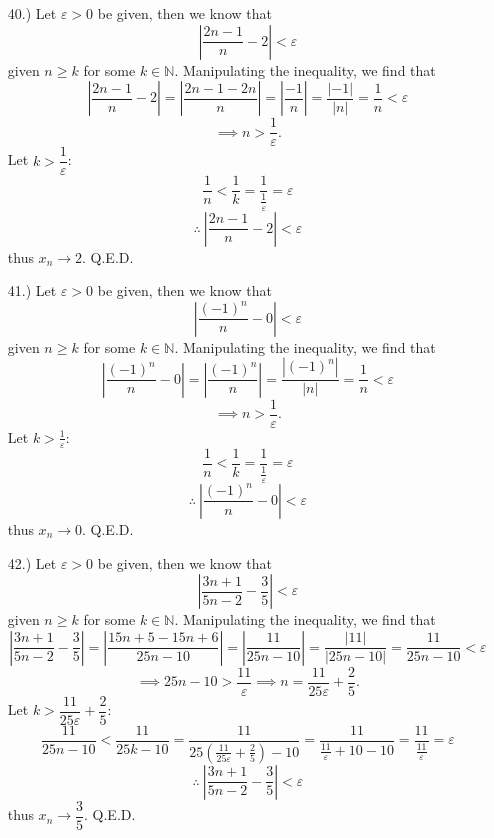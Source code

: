 \documentclass[12pt]{article}
\newcommand{\vertb}[1]{\left\vert#1\right\vert}
\newcommand{\parns}[1]{\left(#1\right)}
\newcommand{\e}{\varepsilon}
\begin{document}
\begin{itemize}
    \item [40.)] Let $\varepsilon>0$ be given, then we know that
    \[\vertb{\frac{2n-1}{n}-2}<\varepsilon\]
    given $n\geq k$ for some $k\in\mathbb{N}$. Manipulating the inequality, we find that
    \[\vertb{\frac{2n-1}{n}-2}=\vertb{\frac{2n-1-2n}{n}}=\vertb{\frac{-1}{n}}=\frac{\vertb{-1}}{\vertb{n}}=\frac{1}{n}<\varepsilon\]
    \[\implies n>\frac{1}{\varepsilon}.\]
    Let $k>\dfrac{1}{\varepsilon}$:
    \[\frac{1}{n}<\frac{1}{k}=\frac{1}{\frac{1}{\e}}=\e\]
    \[\therefore\ \vertb{\frac{2n-1}{n}-2}<\e\]
    thus $x_n\to2$. Q.E.D.

    \item [41.)] Let $\e>0$ be given, then we know that
    \[\vertb{\frac{(-1)^n}{n}-0}<\e\]
    given $n\geq k$ for some $k\in\mathbb{N}$. Manipulating the inequality, we find that
    \[\vertb{\frac{(-1)^n}{n}-0}=\vertb{\frac{(-1)^n}{n}}=\frac{\vertb{(-1)^n}}{\vertb{n}}=\frac{1}{n}<\e\]
    \[\implies n>\frac{1}{\e}.\]
    Let $k>\frac{1}{\e}$:
    \[\frac{1}{n}<\frac{1}{k}=\frac{1}{\frac{1}{\e}}=\e\]
    \[\therefore\ \vertb{\frac{(-1)^n}{n}-0}<\e\]
    thus $x_n\to0$. Q.E.D.

    \pagebreak
    \item [42.)] Let $\e>0$ be given, then we know that
    \[\vertb{\frac{3n+1}{5n-2}-\frac{3}{5}}<\e\]
    given $n\geq k$ for some $k\in\mathbb{N}$. Manipulating the inequality, we find that
    \[\vertb{\frac{3n+1}{5n-2}-\frac{3}{5}}=\vertb{\frac{15n+5-15n+6}{25n-10}}=\vertb{\frac{11}{25n-10}}=\frac{\vertb{11}}{\vertb{25n-10}}=\frac{11}{25n-10}<\e\]
    \[\implies 25n-10>\frac{11}{\e}\implies n=\frac{11}{25\e}+\frac{2}{5}.\]
    Let $k>\dfrac{11}{25\e}+\dfrac{2}{5}$:
    \[\frac{11}{25n-10}<\frac{11}{25k-10}=\frac{11}{25\parns{\frac{11}{25\e}+\frac{2}{5}}-10}=\frac{11}{\frac{11}{\e}+10-10}=\frac{11}{\frac{11}{\e}}=\e\]
    \[\therefore\ \vertb{\frac{3n+1}{5n-2}-\frac{3}{5}}<\e\]
    thus $x_n\to\dfrac{3}{5}$. Q.E.D.








\end{itemize}
\end{document}
